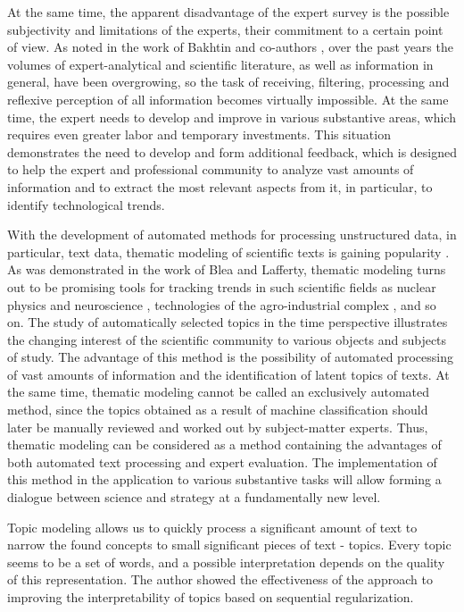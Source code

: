 \documentclass[12pt]{report}
\theoremstyle{definition}
\begin{document}
At the same time, the apparent disadvantage of the expert survey is the possible subjectivity and limitations of the experts, their commitment to a certain point of view.
As noted in the work of Bakhtin and co-authors \cite{bakhtin2017trend}, over the past years the volumes of expert-analytical and scientific literature, as well as information in general, have been overgrowing, so the task of receiving, filtering, processing and reflexive perception of all information becomes virtually impossible.
At the same time, the expert needs to develop and improve in various substantive areas, which requires even greater labor and temporary investments.
This situation demonstrates the need to develop and form additional feedback, which is designed to help the expert and professional community to analyze vast amounts of information and to extract the most relevant aspects from it, in particular, to identify technological trends.

With the development of automated methods for processing unstructured data, in particular, text data, thematic modeling of scientific texts is gaining popularity \cite{blei2006dynamic}.
As was demonstrated in the work of Blea and Lafferty, thematic modeling turns out to be promising tools for tracking trends in such scientific fields as nuclear physics and neuroscience \cite{Blei:2003}, technologies of the agro-industrial complex \cite{bakhtin2017trend} , and so on.
The study of automatically selected topics in the time perspective illustrates the changing interest of the scientific community to various objects and subjects of study.
The advantage of this method is the possibility of automated processing of vast amounts of information and the identification of latent topics of texts.
At the same time, thematic modeling cannot be called an exclusively automated method, since the topics obtained as a result of machine classification should later be manually reviewed and worked out by subject-matter experts.
Thus, thematic modeling can be considered as a method containing the advantages of both automated text processing and expert evaluation.
The implementation of this method in the application to various substantive tasks will allow forming a dialogue between science and strategy at a fundamentally new level.

Topic modeling allows us to quickly process a significant amount of text to narrow the found concepts to small significant pieces of text - topics. 
Every topic seems to be a set of words, and a possible interpretation depends on the quality of this representation.
The author showed the effectiveness of the approach to improving the interpretability of topics based on sequential regularization.
\end{document}
